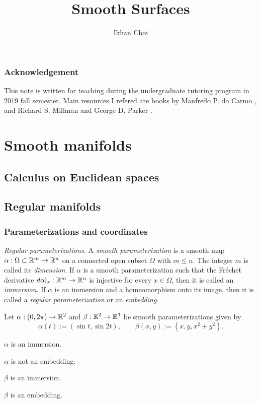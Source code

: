 \documentclass{../note}
\def\a{\alpha}
\begin{document}
\title{Smooth Surfaces}
\author{Ikhan Choi}
\maketitle
\tableofcontents


\section*{Acknowledgement}
This note is written for teaching during the undergraduate tutoring program in 2019 fall semester.
Main resources I refered are books by Manfredo P. do Carmo \cite{}, and Richard S. Millman and George D. Parker \cite{}.





\part{Smooth manifolds}

\chapter{Calculus on Euclidean spaces}





\chapter{Regular manifolds}
\section{Parameterizations and coordinates}

\begin{prb}\emph{Regular parameterizations.}
A \emph{smooth parameterization} is a smooth map $\a:\Omega\subset\R^m\to\R^n$ on a connected open subset $\Omega$ with $m\le n$.
The integer $m$ is called its \emph{dimension}.
If $\a$ is a smooth parameterization such that the Fr\'echet derivative $d\a|_x:\R^m\to\R^n$ is injective for every $x\in\Omega$, then it is called an \emph{immersion}.
If $\a$ is an immersion and a homeomorphism onto its image, then it is called a \emph{regular parameterization} or an \emph{embedding}.

Let $\a:(0,2\pi)\to\R^2$ and $\beta:\mathbb{R}^2\to\mathbb{R}^3$ be smooth parameterizations given by
\[\a(t):=(\sin t,\sin2t),\qquad\beta(x,y):=(x,y,x^2+y^2).\]
\begin{parts}
\item $\a$ is an immersion.
\item $\a$ is not an embedding.
\item $\beta$ is an immersion.
\item $\beta$ is an embedding.
\end{parts}
\end{prb}
\end{document}
